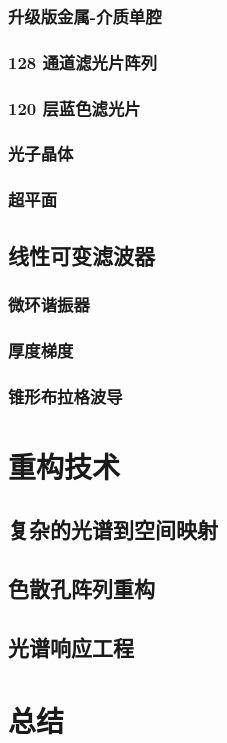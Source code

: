 \documentclass[9 pt,makeindex]{beamer}
\begin{document}
\subsubsection{升级版金属-介质单腔}

\subsubsection{128 通道滤光片阵列}

\subsubsection{120 层蓝色滤光片}

\subsubsection{光子晶体}

\subsubsection{超平面}


\subsection{线性可变滤波器}
\subsubsection{微环谐振器}

\subsubsection{厚度梯度}

\subsubsection{锥形布拉格波导}


\section{重构技术}

\subsection{复杂的光谱到空间映射}
\subsection{色散孔阵列重构}


\subsection{光谱响应工程}


\section{总结}

\end{document}
